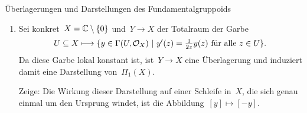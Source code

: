 \documentclass{uebblatt}
\begin{document}
\begin{aufgabe}{Überlagerungen und Darstellungen des Fundamentalgruppoids}
\begin{enumerate}
Sei~$\widetilde X$ die \emph{universelle Überlagerung} von~$X$ bezüglich eines
Basispunkts~$x_0$. Die Punkte von~$\widetilde X$ sind Homotopieklassen von
Wegen, deren Anfangspunkt~$x_0$ und deren Endpunkt beliebig ist. (Die
Homotopien müssen Anfangs- und Endpunkt bewahren.) Topologisiert wird~$\widetilde X$
als Quotientenraum eines Unterraums des Raums der Abbildungen~$[0,1] \to X$;
dieser trägt die Kompakt-Offen-Topologie. Es gibt eine kanonische stetige
Abbildung~$\pi : \widetilde X \to X$, die der Äquivalenzklasse eines Wegs ihren
Endpunkt zuordnet.

Sei dann ein beliebiger bei~$x_0$ beginnender Weg~$\gamma$ in~$X$ und
ein Urbild~$z$ von~$x_0$ unter~$\pi$ gegeben. Dann gibt es einen \emph{Lift}
von~$\gamma$ auf~$\widetilde X$, das heißt einen Weg~$\widetilde\gamma$
in~$\widetilde X$ mit~$\widetilde\gamma(0) = z$ und~$\pi \circ \widetilde\gamma
= \gamma$.

\emph{Hinweis:} Mit Notation aus Homotopietyptheorie macht der Beweis mehr
Spaß.
\item Sei konkret~$X = \mathbb{C} \setminus \{0\}$ und~$Y \to X$ der Totalraum der
Garbe
\[ U \subseteq X \longmapsto \{ y \in \Gamma(U,\mathcal{O}_X) \ |\
  \text{$y'(z) = \tfrac{1}{2z} y(z)$ für alle~$z \in U$} \}. \]
Da diese Garbe lokal konstant ist, ist~$Y \to X$ eine Überlagerung und
induziert damit eine Darstellung von~$\Pi_1(X)$.

Zeige: Die Wirkung dieser Darstellung auf einer Schleife in~$X$, die sich genau
einmal um den Ursprung windet, ist die Abbildung~$[y] \mapsto [-y]$.
\end{enumerate}
\end{aufgabe}
\end{document}
